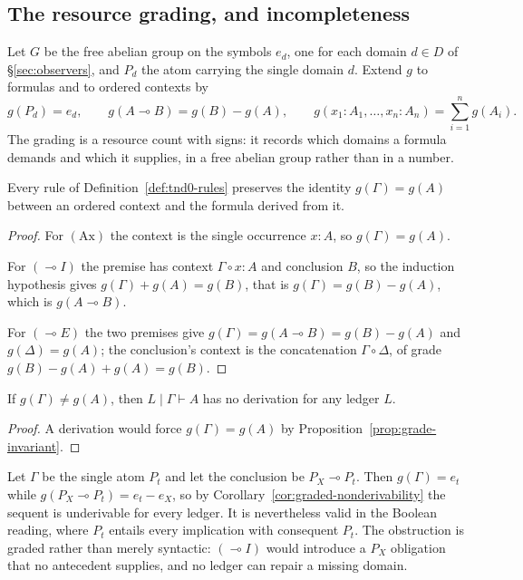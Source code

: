 \subsection{The resource grading, and incompleteness}

\begin{definition}\label{def:grade}
Let $G$ be the free abelian group on the symbols $e_d$, one for each domain $d\in D$ of
\S\ref{sec:observers}, and $P_d$ the atom carrying the single domain $d$.  Extend $g$ to
formulas and to ordered contexts by
\[
  g(P_d)=e_d,
  \qquad
  g(A\multimap B)=g(B)-g(A),
  \qquad
  g(x_1:A_1,\dots,x_n:A_n)=\sum_{i=1}^{n}g(A_i).
\]
The grading is a resource count with signs: it records which domains a formula demands and
which it supplies, in a free abelian group rather than in a number.
\end{definition}

\begin{proposition}\label{prop:grade-invariant}
Every rule of Definition~\ref{def:tnd0-rules} preserves the identity $g(\Gamma)=g(A)$
between an ordered context and the formula derived from it.
\end{proposition}

\begin{proof}
For $(\mathrm{Ax})$ the context is the single occurrence $x:A$, so $g(\Gamma)=g(A)$.

For $(\multimap I)$ the premise has context $\Gamma\circ x:A$ and conclusion $B$, so the
induction hypothesis gives $g(\Gamma)+g(A)=g(B)$, that is $g(\Gamma)=g(B)-g(A)$, which is
$g(A\multimap B)$.

For $(\multimap E)$ the two premises give $g(\Gamma)=g(A\multimap B)=g(B)-g(A)$ and
$g(\Delta)=g(A)$; the conclusion's context is the concatenation $\Gamma\circ\Delta$, of
grade $g(B)-g(A)+g(A)=g(B)$.
\end{proof}

\begin{corollary}\label{cor:graded-nonderivability}
If $g(\Gamma)\ne g(A)$, then $L\mid\Gamma\vdash A$ has no derivation for any ledger $L$.
\end{corollary}

\begin{proof}
A derivation would force $g(\Gamma)=g(A)$ by
Proposition~\ref{prop:grade-invariant}.
\end{proof}

\begin{example}\label{ex:graded-witness}
Let $\Gamma$ be the single atom $P_t$ and let the conclusion be $P_X\multimap P_t$.  Then
$g(\Gamma)=e_t$ while $g(P_X\multimap P_t)=e_t-e_X$, so by
Corollary~\ref{cor:graded-nonderivability} the sequent is underivable for every ledger.  It
is nevertheless valid in the Boolean reading, where $P_t$ entails every implication with
consequent $P_t$.  The obstruction is graded rather than merely syntactic:
$(\multimap I)$ would introduce a $P_X$ obligation that no antecedent supplies, and no
ledger can repair a missing domain.
\end{example}

